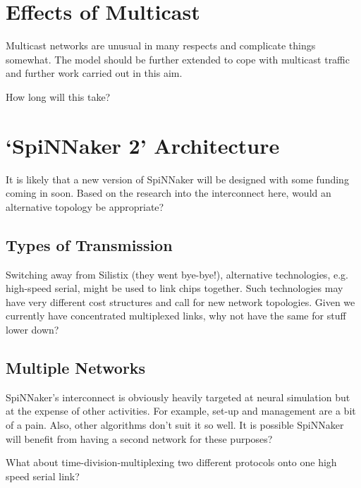 	
	\section{Effects of Multicast}
		
		Multicast networks are unusual in many respects and complicate things
		somewhat. The model should be further extended to cope with multicast
		traffic and further work carried out in this aim.
		
		How long will this take?
	
	\section{`SpiNNaker 2' Architecture}
		
		It is likely that a new version of SpiNNaker will be designed with some
		funding coming in soon. Based on the research into the interconnect here,
		would an alternative topology be appropriate?
		
		\subsection{Types of Transmission}
			
			Switching away from Silistix (they went bye-bye!), alternative
			technologies, e.g. high-speed serial, might be used to link chips
			together. Such technologies may have very different cost structures and
			call for new network topologies. Given we currently have concentrated
			multiplexed links, why not have the same for stuff lower down?
		
		\subsection{Multiple Networks}
			
			SpiNNaker's interconnect is obviously heavily targeted at neural
			simulation but at the expense of other activities. For example, set-up and
			management are a bit of a pain. Also, other algorithms don't suit it so
			well. It is possible SpiNNaker will benefit from having a second network
			for these purposes?
			
			What about time-division-multiplexing two different protocols onto one
			high speed serial link?

